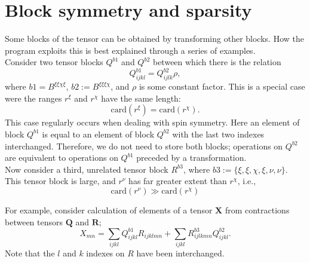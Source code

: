 \section { Block symmetry and sparsity }

Some blocks of the tensor can be obtained by transforming other blocks. How the program exploits this is best explained
through a series of examples.\\ 

\noindent Consider two tensor blocks $Q^{b1}$ and $Q^{b2}$ between which there is the relation
\begin{equation}
Q^{b1}_{ijkl} = Q^{b2}_{ijlk}\rho,
\label{eqn:Qsymm}
\end{equation}
where $b1 = B^{\xi\xi\chi\xi }$, $b2 := B^{\xi\xi\xi\chi }$, and $\rho$ is some constant factor. This is a special case were the ranges $r^{\xi}$ and $r^{\chi}$ have
the same length:
\begin{equation}
\text{card}(r^{\xi}) = \text{card}(r^{\chi}).
\end{equation}
This case regularly occurs when dealing with spin symmetry. Here an element of block $Q^{b1}$ is equal to an element of block $Q^{b2}$ with the last two indexes interchanged.
Therefore, we do not need to store both blocks; operations on $Q^{b2}$ are equivalent to operations on $Q^{b1}$ preceded by a transformation.\\

\noindent Now consider a third, unrelated tensor block $R^{b3}$, where $b3 := \{\xi, \xi, \chi, \xi, \nu, \nu \}$. 
This tensor block is large, and $r^{\nu}$ has far greater extent than $r^{\chi}$, i.e.,
\begin{equation}
\text{card}(r^{\nu}) \gg \text{card}(r^{\chi})
\end{equation}

\noindent For example, consider calculation of elements of a tensor $\mathbf{X}$ from contractions between tensors $\mathbf{Q}$ and $\mathbf{R}$;
\begin{equation}
X_{mn} = \sum_{ijkl} Q^{b1}_{ijkl} R_{ijklmn}+ \sum_{ijkl} R^{b3}_{ijlkmn}Q^{b2}_{ijkl}.
\label{eqn:Xexample}
\end{equation} 
Note that the $l$ and $k$ indexes on $R$ have been interchanged. \\

